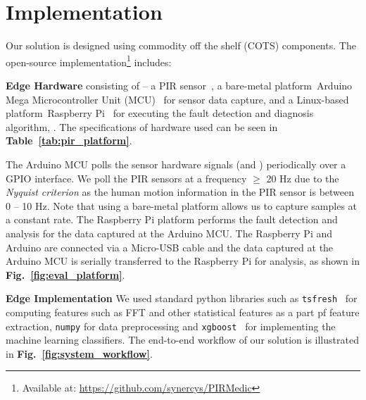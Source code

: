 \section{Implementation}
\label{sec:impl}

Our solution is designed using commodity off the shelf (COTS) components.
The open-source implementation\footnote{Available at: \url{https://github.com/synercys/PIRMedic}} includes:


\ca \textbf{Edge Hardware} consisting of -- \ci a PIR sensor~\cite{PIR_sensor_eval}, \cii a bare-metal platform~\viz Arduino Mega Microcontroller Unit (MCU)~\cite{arduino_mega} 
for sensor data capture, and \ciii a Linux-based platform~\viz Raspberry Pi~\cite{rpi3} 
for executing the fault detection and diagnosis algorithm, \sol. The specifications of hardware used can be seen in {\bfseries Table~\ref{tab:pir_platform}}.%


The Arduino MCU polls the sensor hardware signals (\ie \cout and \aout) periodically over a GPIO interface. We poll the PIR sensors at a frequency $\geq$ 20 Hz due to the \textit{Nyquist criterion} as the human motion information in the PIR sensor is between 0 -- 10 Hz. %
Note that using a bare-metal platform allows us to capture \aout samples at a constant rate. %
The Raspberry Pi platform performs the fault detection and analysis for the data captured at the Arduino MCU.
The Raspberry Pi and Arduino are connected via a Micro-USB cable and the data captured at the Arduino MCU is serially transferred to the Raspberry Pi for analysis, as shown in {\bfseries Fig.~\ref{fig:eval_platform}}.%

\cb \textbf{Edge Implementation} We used standard python libraries such as \texttt{tsfresh}~\cite{tsfresh2018code,christ2016distributed} for computing features such as FFT and other statistical features as a part pf feature extraction, \texttt{numpy} for data preprocessing and 
\texttt{xgboost}~\cite{shap_implementation} for implementing the machine learning classifiers. %
The end-to-end workflow of our solution is illustrated in {\bfseries Fig.~\ref{fig:system_workflow}}.


